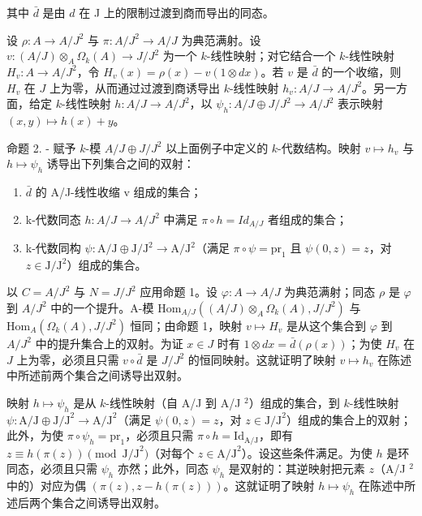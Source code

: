 其中 \(\bar{d}\) 是由 \(d\) 在 J 上的限制过渡到商而导出的同态。

设 \(\rho : A \to A/J^{2}\) 与 \(\pi : A/J^{2} \to A/J\) 为典范满射。设 \(v : (A/J) \otimes_{A} \Omega_{k}(A) \longrightarrow J/J^{2}\) 为一个 \(k\)-线性映射；对它结合一个 \(k\)-线性映射 \(H_{v} : A \to A/J^{2}\)，令 \(H_{v}(x) = \rho(x) - v(1 \otimes dx)\)。若 \(v\) 是 \(\bar{d}\) 的一个收缩，则 \(H_{v}\) 在 \(J\) 上为零，从而通过过渡到商诱导出 \(k\)-线性映射 \(h_{v} : A/J \to A/J^{2}\)。另一方面，给定 \(k\)-线性映射 \(h : A/J \to A/J^{2}\)，以 \(\psi_{h} : A/J \oplus J/J^{2} \longrightarrow A/J^{2}\) 表示映射 \((x,y) \mapsto h(x)+y\)。

命题 2. - 赋予 \(k\)-模 \(A / J \oplus J / J^2\) 以上面例子中定义的 \(k\)-代数结构。映射 \(v \mapsto h_v\) 与 \(h \mapsto \psi_h\) 诱导出下列集合之间的双射：

\begin{enumerate}
\def\labelenumi{(\roman{enumi})}
\item
  \(\bar{d}\) 的 A/J-线性收缩 v 组成的集合；
\item
  k-代数同态 \(h: A/J \to A/J^{2}\) 中满足 \(\pi \circ h = Id_{A/J}\) 者组成的集合；
\item
  k-代数同构 \(\psi : \mathrm{A} / \mathrm{J} \oplus \mathrm{J} / \mathrm{J}^2 \longrightarrow \mathrm{A} / \mathrm{J}^2\)（满足 \(\pi \circ \psi = \mathrm{pr}_1\) 且 \(\psi(0, z) = z\)，对 \(z \in \mathrm{J} / \mathrm{J}^2\)）组成的集合。
\end{enumerate}

以 \(C = A / J^2\) 与 \(N = J / J^2\) 应用命题 1。设 \(\varphi : A \to A / J\) 为典范满射；同态 \(\rho\) 是 \(\varphi\) 到 \(A / J^2\) 中的一个提升。A-模 \(\text{Hom}_{A / J}((A / J) \otimes_A \Omega_k(A), J / J^2)\) 与 \(\text{Hom}_A(\Omega_k(A), J / J^2)\) 恒同；由命题 1，映射 \(v \mapsto H_v\) 是从这个集合到 \(\varphi\) 到 \(A / J^2\) 中的提升集合上的双射。为证 \(x \in J\) 时有 \(1 \otimes dx = \bar{d}(\rho(x))\)；为使 \(H_v\) 在 \(J\) 上为零，必须且只需 \(v \circ \bar{d}\) 是 \(J / J^2\) 的恒同映射。这就证明了映射 \(v \mapsto h_v\) 在陈述中所述前两个集合之间诱导出双射。

映射 \(h \mapsto \psi_h\) 是从 \(k\)-线性映射（自 A/J 到 A/J \(^2\)）组成的集合，到 \(k\)-线性映射 \(\psi : \text{A/J} \oplus \text{J/J}^2 \longrightarrow \text{A/J}^2\)（满足 \(\psi(0,z) = z\)，对 \(z \in \text{J/J}^2\)）组成的集合上的双射；此外，为使 \(\pi \circ \psi_h = \text{pr}_1\)，必须且只需 \(\pi \circ h = \text{Id}_{\text{A/J}}\)，即有 \(z \equiv h(\pi(z)) \pmod{\text{J/J}^2}\)（对每个 \(z \in \text{A/J}^2\)）。设这些条件满足。为使 \(h\) 是环同态，必须且只需 \(\psi_h\) 亦然；此外，同态 \(\psi_h\) 是双射的：其逆映射把元素 \(z\)（A/J \(^2\) 中的）对应为偶 \((\pi(z), z - h(\pi(z)))\)。这就证明了映射 \(h \mapsto \psi_h\) 在陈述中所述后两个集合之间诱导出双射。

